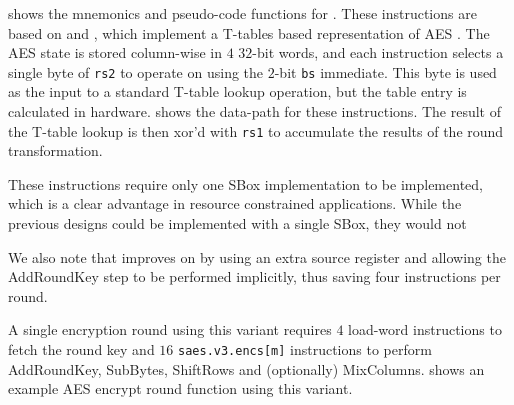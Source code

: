 

 shows the mnemonics and pseudo-code functions
for .
These instructions are based on
\cite{NadIkeKur:04,BBFR:06} and \cite{Saarinen:20},
which implement a T-tables based representation of AES \cite{DaeRij:02}.
The AES state is stored column-wise in $4$ $32$-bit words, and
each instruction selects a single byte of {\tt rs2} to operate on
using the $2$-bit {\tt bs} immediate.
This byte is used as the input to a standard T-table lookup operation,
but the table entry is calculated in hardware.
 shows the data-path for these instructions.
The result of the T-table lookup is then xor'd with {\tt rs1} to
accumulate the results of the round transformation.

These instructions require only one SBox implementation to be implemented,
which is a clear advantage in resource constrained applications.
While the previous designs could be implemented with a single SBox, they
would not

We also note that \cite{Saarinen:20} improves on \cite{BBFR:06}
by using an extra source register and allowing the AddRoundKey step to be
performed implicitly, thus saving four instructions per round.

A single encryption round using this variant requires
$4$ load-word instructions to fetch the round key and
$16$ {\tt saes.v3.encs[m]} instructions to perform AddRoundKey,
SubBytes, ShiftRows and (optionally) MixColumns.
 shows an example AES encrypt round function
using this variant.

